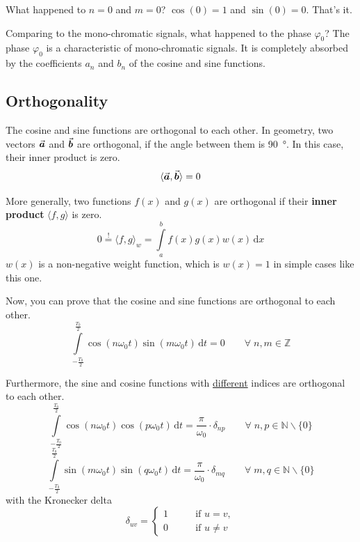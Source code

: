 \begin{refsection}
What happened to $n = 0$ and $m = 0$? $\cos(0) = 1$ and $\sin(0) = 0$. That's it.

Comparing to the mono-chromatic signals, what happened to the phase $\varphi_0$? The phase $\varphi_0$ is a characteristic of mono-chromatic signals. It is completely absorbed by the coefficients $a_n$ and $b_n$ of the cosine and sine functions.

\subsection{Orthogonality}
The cosine and sine functions are orthogonal to each other. In geometry, two vectors $\vec{\bm{a}}$ and $\vec{\bm{b}}$ are orthogonal, if the angle between them is \SI{90}{\degree}. In this case, their inner product is zero.
\begin{equation}
	\langle \vec{\bm{a}}, \vec{\bm{b}} \rangle = 0
\end{equation}%

More generally, two functions $f(x)$ and $g(x)$ are orthogonal if their  \textbf{inner product} $\langle f, g \rangle$ is zero. 
\begin{equation}
	0 \stackrel{!}{=} \langle f, g \rangle_w = \int\limits_{a}^{b} f(x) g(x) w(x) \, \mathrm{d} x
\end{equation}
$w(x)$ is a non-negative weight function, which is $w(x) = 1$ in simple cases like this one.

Now, you can prove that the cosine and sine functions are orthogonal to each other.
\begin{equation}
	\int\limits_{-\frac{T_0}{2}}^{\frac{T_0}{2}} \cos\left(n \omega_0 t\right) \sin\left(m \omega_0 t\right) \, \mathrm{d} t = 0 \qquad \forall \; n, m \in \mathbb{Z}
	\label{eq:ch02:orth_rel_cos_sin}
\end{equation}

Furthermore, the sine and cosine functions with \underline{different} indices are orthogonal to each other.
\begin{equation}
	\int\limits_{-\frac{T_0}{2}}^{\frac{T_0}{2}} \cos\left(n \omega_0 t\right) \cos\left(p \omega_0 t\right) \, \mathrm{d} t = \frac{\pi}{\omega_0} \cdot \delta_{np} \qquad \forall \; n, p \in \mathbb{N} \backslash \{0\}
	\label{eq:ch02:orth_rel_cos}
\end{equation}
\begin{equation}
	\int\limits_{-\frac{T_0}{2}}^{\frac{T_0}{2}} \sin\left(m \omega_0 t\right) \sin\left(q \omega_0 t\right) \, \mathrm{d} t = \frac{\pi}{\omega_0} \cdot \delta_{mq} \qquad \forall \; m, q \in \mathbb{N} \backslash \{0\}
	\label{eq:ch02:orth_rel_sin}
\end{equation}
with the Kronecker delta
\begin{equation}
	\delta_{uv} = \begin{cases}
		1 & \qquad \text{if } u = v, \\
		0 & \qquad \text{if } u \neq v
	\end{cases}
	\label{eq:ch02:kronecker_delta}
\end{equation}%


\end{refsection}
